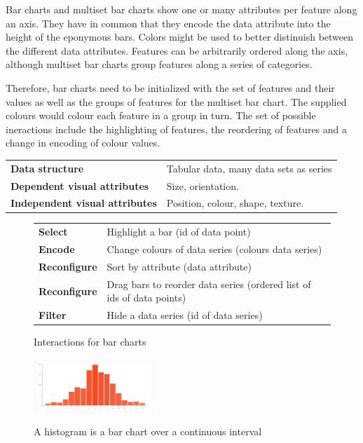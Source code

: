 \documentclass{article}
\newcommand{\conceptTable}[3]{%
    \begin{center}
    {\small
        \begin{tabulary}{\textwidth}{ll}
            \bf Data structure & #1 \\

            \bf Dependent visual attributes & #2 \\

            \bf Independent visual attributes & #3  \\
        \end{tabulary}
    }
    \end{center}
}
\begin{document}
Bar charts and multiset bar charts show one or many attributes per feature along an axis.
They have in common that they encode the data attribute into the height of the eponymous bars.
Colors might be used to better distinuish between the different data attributes.
Features can be arbitrarily ordered along the axis, although multiset bar charts group features along a series of categories.

Therefore, bar charts need to be initialized with the set of features and their values as well as the groups of features for the multiset bar chart.
The supplied colours would colour each feature in a group in turn.
The set of possible ineractions include the highlighting of features, the reordering of features and a change in encoding of colour values.

\conceptTable{Tabular data, many data sets as series}{Size, orientation.}{Position, colour, shape, texture.}

\begin{figure}
    \begin{center}
        \caption{Interactions for bar charts}\label{fig:concept:chart-types:bar-charts:interactions}
        {\small
            \begin{tabulary}{\textwidth}{ll}
                \bf Select & Highlight a bar (id of data point) \\
                \bf Encode & Change colours of data series (colours \rightarrow{} data series) \\
                \bf Reconfigure & Sort by attribute (data attribute) \\
                \bf Reconfigure & Drag bars to reorder data series (ordered list of ids of data points) \\
                \bf Filter & Hide a data series (id of data series) \\
            \end{tabulary}
        }
    \end{center}
\end{figure}


\begin{figure}
  \centering
    \includegraphics[width=0.4\textwidth]{images/chartTypes/histogram.png}%
    \label{fig:concept:chart-types:histograms}
    \caption{A histogram is a bar chart over a continuous interval}%
\end{figure}
\end{document}
